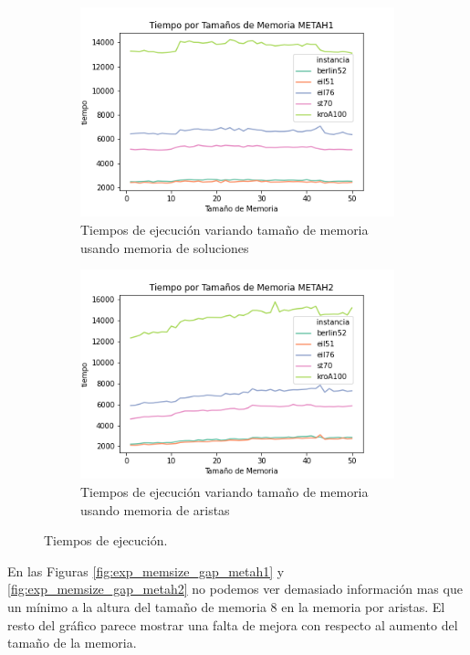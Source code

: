 \documentclass[10pt,a4paper]{article}
\begin{document}
\begin{figure}[h!]
    \centering
    \begin{subfigure}{0.45\linewidth}
        \centering
        \includegraphics[scale=0.35]{Graphs-metaH/memsize-tiempo-METAH1.png}
        \caption{Tiempos de ejecución variando tamaño de memoria usando memoria de soluciones}
        \label{fig:exp_memsize_tiempo_metah1}
    \end{subfigure}
    \begin{subfigure}{0.45\linewidth}
        \centering
        \includegraphics[scale=0.35]{Graphs-metaH/memsize-tiempo-METAH2.png}
        \caption{Tiempos de ejecución variando tamaño de memoria usando memoria de aristas}
        \label{fig:exp_memsize_tiempo_metah2}
    \end{subfigure}
    \caption{Tiempos de ejecución.}
\end{figure}

En las Figuras \ref{fig:exp_memsize_gap_metah1} y \ref{fig:exp_memsize_gap_metah2} no podemos ver demasiado información mas que un mínimo a la altura del tamaño de memoria 8 en la memoria por aristas. El resto del gráfico parece mostrar una falta de mejora con respecto al aumento del tamaño de la memoria.
\end{document}
